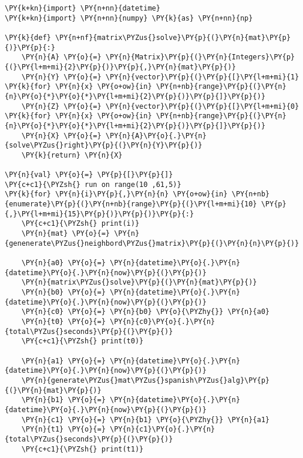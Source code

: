 \begin{english}
    \begin{tcolorbox}[breakable, size=fbox, boxrule=1pt, pad at break*=1mm,colback=cellbackground, colframe=cellborder]
\begin{Verbatim}[commandchars=\\\{\}]
\PY{k+kn}{import} \PY{n+nn}{datetime}
\PY{k+kn}{import} \PY{n+nn}{numpy} \PY{k}{as} \PY{n+nn}{np}

\PY{k}{def} \PY{n+nf}{matrix\PYZus{}solve}\PY{p}{(}\PY{n}{mat}\PY{p}{)}\PY{p}{:}
    \PY{n}{A} \PY{o}{=} \PY{n}{Matrix}\PY{p}{(}\PY{n}{Integers}\PY{p}{(}\PY{l+m+mi}{2}\PY{p}{)}\PY{p}{,}\PY{n}{mat}\PY{p}{)}
    \PY{n}{Y} \PY{o}{=} \PY{n}{vector}\PY{p}{(}\PY{p}{[}\PY{l+m+mi}{1} \PY{k}{for} \PY{n}{x} \PY{o+ow}{in} \PY{n+nb}{range}\PY{p}{(}\PY{n}{n}\PY{o}{*}\PY{o}{*}\PY{l+m+mi}{2}\PY{p}{)}\PY{p}{]}\PY{p}{)}
    \PY{n}{Z} \PY{o}{=} \PY{n}{vector}\PY{p}{(}\PY{p}{[}\PY{l+m+mi}{0} \PY{k}{for} \PY{n}{x} \PY{o+ow}{in} \PY{n+nb}{range}\PY{p}{(}\PY{n}{n}\PY{o}{*}\PY{o}{*}\PY{l+m+mi}{2}\PY{p}{)}\PY{p}{]}\PY{p}{)}
    \PY{n}{X} \PY{o}{=} \PY{n}{A}\PY{o}{.}\PY{n}{solve\PYZus{}right}\PY{p}{(}\PY{n}{Y}\PY{p}{)}
    \PY{k}{return} \PY{n}{X}

\PY{n}{val} \PY{o}{=} \PY{p}{[}\PY{p}{]}
\PY{c+c1}{\PYZsh{} run on range(10 ,61,5)}
\PY{k}{for} \PY{n}{i}\PY{p}{,}\PY{n}{n} \PY{o+ow}{in} \PY{n+nb}{enumerate}\PY{p}{(}\PY{n+nb}{range}\PY{p}{(}\PY{l+m+mi}{10} \PY{p}{,}\PY{l+m+mi}{15}\PY{p}{)}\PY{p}{)}\PY{p}{:}
    \PY{c+c1}{\PYZsh{} print(i)}
    \PY{n}{mat} \PY{o}{=} \PY{n}{genenerate\PYZus{}neighbord\PYZus{}matrix}\PY{p}{(}\PY{n}{n}\PY{p}{)}

    \PY{n}{a0} \PY{o}{=} \PY{n}{datetime}\PY{o}{.}\PY{n}{datetime}\PY{o}{.}\PY{n}{now}\PY{p}{(}\PY{p}{)}
    \PY{n}{matrix\PYZus{}solve}\PY{p}{(}\PY{n}{mat}\PY{p}{)}
    \PY{n}{b0} \PY{o}{=} \PY{n}{datetime}\PY{o}{.}\PY{n}{datetime}\PY{o}{.}\PY{n}{now}\PY{p}{(}\PY{p}{)}
    \PY{n}{c0} \PY{o}{=} \PY{n}{b0} \PY{o}{\PYZhy{}} \PY{n}{a0}
    \PY{n}{t0} \PY{o}{=} \PY{n}{c0}\PY{o}{.}\PY{n}{total\PYZus{}seconds}\PY{p}{(}\PY{p}{)}
    \PY{c+c1}{\PYZsh{} print(t0)}
    
    \PY{n}{a1} \PY{o}{=} \PY{n}{datetime}\PY{o}{.}\PY{n}{datetime}\PY{o}{.}\PY{n}{now}\PY{p}{(}\PY{p}{)}
    \PY{n}{generate\PYZus{}mat\PYZus{}spanish\PYZus{}alg}\PY{p}{(}\PY{n}{mat}\PY{p}{)}
    \PY{n}{b1} \PY{o}{=} \PY{n}{datetime}\PY{o}{.}\PY{n}{datetime}\PY{o}{.}\PY{n}{now}\PY{p}{(}\PY{p}{)}
    \PY{n}{c1} \PY{o}{=} \PY{n}{b1} \PY{o}{\PYZhy{}} \PY{n}{a1}
    \PY{n}{t1} \PY{o}{=} \PY{n}{c1}\PY{o}{.}\PY{n}{total\PYZus{}seconds}\PY{p}{(}\PY{p}{)}
    \PY{c+c1}{\PYZsh{} print(t1)}
    

\end{Verbatim}
\end{tcolorbox}
\end{english}
